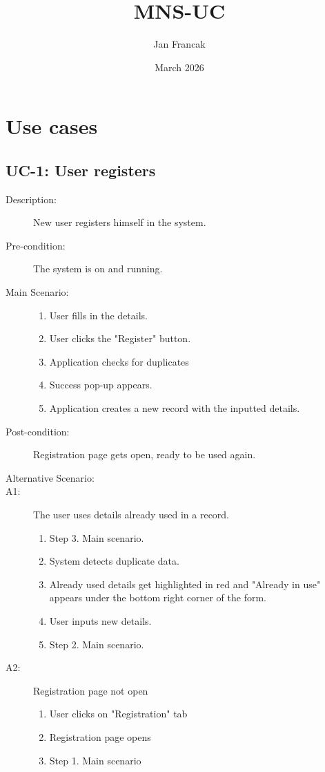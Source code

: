 \documentclass{article}
\title{MNS-UC}
\author{Jan Francak}
\date{March 2026}
\begin{document}
\maketitle

\section{Use cases}

\subsection{UC-1: User registers}

\begin{description}
    \item[Description:] New user registers himself in the system.
    \item[Pre-condition:] The system is on and running.
    \item[Main Scenario:] \hfill
    \begin{enumerate}
        \item User fills in the details.
        \item User clicks the "Register" button.
        \item Application checks for duplicates
        \item Success pop-up appears.
        \item Application creates a new record with the inputted details.
    \end{enumerate}
    \item[Post-condition:] Registration page gets open, ready to be used again.
    \item[Alternative Scenario:] \hfill
    \item[A1:] The user uses details already used in a record.
    \begin{enumerate}
        \item Step 3. Main scenario.
        \item System detects duplicate data.
        \item Already used details get highlighted in red and "Already in use" appears under the bottom right corner of the form.
        \item User inputs new details.
        \item Step 2. Main scenario.
    \end{enumerate}
    
\newpage

    \item[A2:] Registration page not open
    \begin{enumerate}
        \item User clicks on "Registration" tab
        \item Registration page opens
        \item Step 1. Main scenario
    \end{enumerate}
\end{description}
\end{document}
